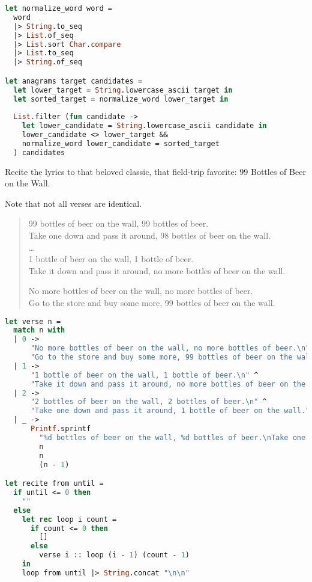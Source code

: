 \begin{lstlisting}[language=OCaml]
let normalize_word word =
  word
  |> String.to_seq
  |> List.of_seq
  |> List.sort Char.compare
  |> List.to_seq
  |> String.of_seq

let anagrams target candidates =
  let lower_target = String.lowercase_ascii target in
  let sorted_target = normalize_word lower_target in
  
  List.filter (fun candidate ->
    let lower_candidate = String.lowercase_ascii candidate in
    lower_candidate <> lower_target && 
    normalize_word lower_candidate = sorted_target
  ) candidates
\end{lstlisting}

Recite the lyrics to that beloved classic, that field-trip favorite: 99 Bottles of Beer on the Wall.

Note that not all verses are identical.

\begin{quote}
  99 bottles of beer on the wall, 99 bottles of beer.\\
  Take one down and pass it around, 98 bottles of beer on the wall.\\
  \dots\\
  1 bottle of beer on the wall, 1 bottle of beer.\\
  Take it down and pass it around, no more bottles of beer on the wall.

  No more bottles of beer on the wall, no more bottles of beer.\\
  Go to the store and buy some more, 99 bottles of beer on the wall.
\end{quote}

\begin{lstlisting}[language=OCaml]
let verse n =
  match n with
  | 0 ->
      "No more bottles of beer on the wall, no more bottles of beer.\n" ^
      "Go to the store and buy some more, 99 bottles of beer on the wall."
  | 1 ->
      "1 bottle of beer on the wall, 1 bottle of beer.\n" ^
      "Take it down and pass it around, no more bottles of beer on the wall."
  | 2 ->
      "2 bottles of beer on the wall, 2 bottles of beer.\n" ^
      "Take one down and pass it around, 1 bottle of beer on the wall."
  | _ ->
      Printf.sprintf
        "%d bottles of beer on the wall, %d bottles of beer.\nTake one down and pass it around, %d bottles of beer on the wall."
        n
        n
        (n - 1)

let recite from until =
  if until <= 0 then
    ""
  else
    let rec loop i count =
      if count <= 0 then
        []
      else
        verse i :: loop (i - 1) (count - 1)
    in
    loop from until |> String.concat "\n\n"
\end{lstlisting}


